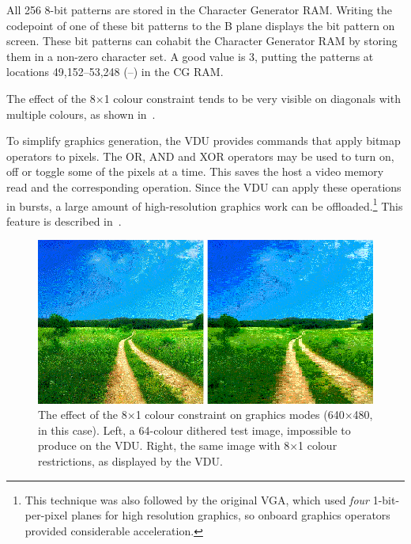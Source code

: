 All 256 8-bit patterns are stored in the Character Generator RAM. Writing the
codepoint of one of these bit patterns to the B plane displays the bit pattern
on screen. These bit patterns can cohabit the Character Generator RAM by
storing them in a non-zero  character set. A good value is 3,
putting the patterns at locations 49,152–53,248 (–) in the
CG RAM.

The effect of the 8×1 colour constraint tends to be very visible on diagonals
with multiple colours, as shown in~.

To simplify graphics generation, the VDU provides commands that apply bitmap
operators to pixels. The OR, AND and XOR operators may be used to turn on, off
or toggle some of the pixels at a time. This saves the host a video memory read
and the corresponding operation. Since the VDU can apply these operations in
bursts, a large amount of high-resolution graphics work can be
offloaded.\footnote{This technique was also followed by the original VGA, which
  used {\em four\/} 1-bit-per-pixel planes for high resolution graphics, so
  onboard graphics operators provided considerable acceleration.} This feature
is described in~.

\begin{figure}
  \centering
  \includegraphics[width=0.9\columnwidth]{../figs/colour-restrictions.png}%
  \caption[Effect of colour constraints]{\label{fig:colour-constraints}The
    effect of the 8×1 colour constraint on graphics modes (640×480, in this
    case). Left, a 64-colour dithered test image, impossible to produce on the
    VDU. Right, the same image with 8×1 colour restrictions, as displayed by
    the VDU.}
\end{figure}




